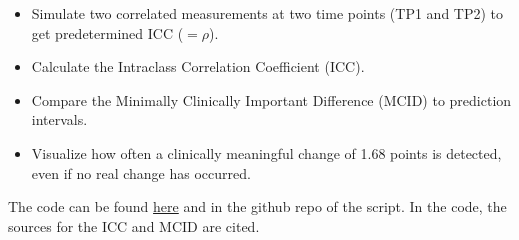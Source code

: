 \documentclass[
]{article}
\providecommand{\tightlist}{%
  \setlength{\itemsep}{0pt}\setlength{\parskip}{0pt}}
\begin{document}
\begin{itemize}
\tightlist
\item
  Simulate two correlated measurements at two time points (TP1 and TP2)
  to get predetermined ICC (\(=\rho\)).
\item
  Calculate the Intraclass Correlation Coefficient (ICC).
\item
  Compare the Minimally Clinically Important Difference (MCID) to prediction intervals.
\item
  Visualize how often a clinically meaningful change of 1.68 points is
  detected, even if no real change has occurred.
\end{itemize}

The code can be found \href{https://github.com/jdegenfellner/ICC_MCID/blob/main/ICC_MCID.R}{here}
and in the github repo of the script. In the code, the sources for the ICC and MCID are
cited.
\end{document}
